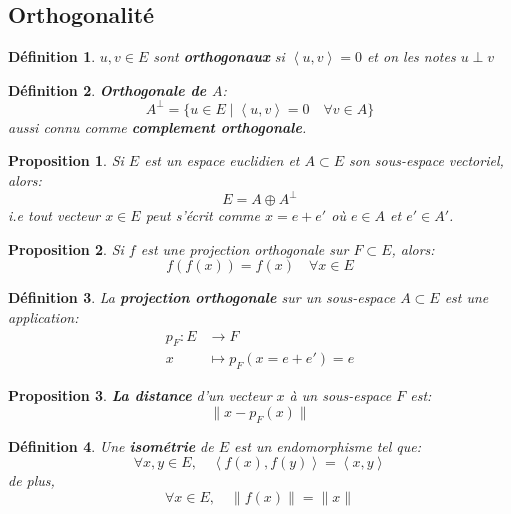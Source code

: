 \documentclass[a4paper]{article}
\newcommand{\scalair}[1]{\left\langle #1 \right\rangle}
\newtheorem{definition}{Définition}[section]
\newtheorem{prop}{Proposition}[section]
\begin{document}
\subsection{Orthogonalité}
\begin{definition}
    $u, v \in E$ sont \textbf{orthogonaux} si $\scalair{u, v} = 0$ et on les notes  $u \perp v$
\end{definition}
\begin{definition}
    \textbf{Orthogonale de $A$}:
    \[
        A^{\perp} = \{ u \in E \mid \scalair{u, v} = 0 \quad \forall v \in A \}
    \] 
    aussi connu comme  \textbf{complement orthogonale}.
\end{definition}
\begin{prop}
   Si $E$ est un espace euclidien et  $A \subset E$ son sous-espace vectoriel, alors:
   \[
       E = A \oplus A^{\perp}
   \] 
   i.e tout vecteur $x \in E$ peut s'écrit comme  $x = e + e'$ où  $e \in A$ et  $e' \in A'$.
\end{prop}
\begin{prop}
   Si $f$ est une projection orthogonale sur  $F \subset E$, alors:
   \[
   f(f(x)) = f(x) \quad \forall x \in E
   \] 
\end{prop}
\begin{definition}
    La \textbf{projection orthogonale} sur un sous-espace $A \subset E$ est une application:
    \begin{align*}
        p_F: E &\longrightarrow F \\
        x &\longmapsto p_F(x = e + e') = e
    \end{align*}
\end{definition}
\begin{prop}
    \textbf{La distance} d'un vecteur $x$ à un sous-espace  $F$ est:
    \[
    \|x - p_F(x)\|
    \] 
\end{prop}
\begin{definition}
    Une \textbf{isométrie} de $E$ est un endomorphisme tel que:
     \[
         \forall x, y \in E, \quad \scalair{f(x), f(y)} = \scalair{x, y}
    \]
    de plus,
    \[
    \forall x \in E, \quad \|f(x)\| = \|x\|
    \] 
\end{definition}
\end{document}
